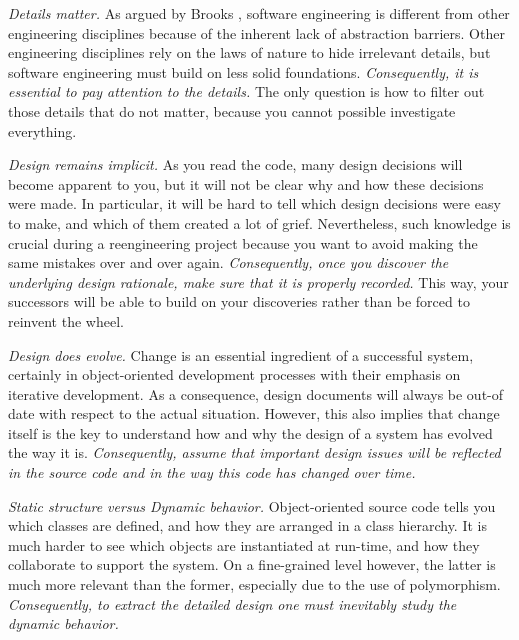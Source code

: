 \documentclass[a4paper,10pt,twoside]{book}
\begin{document}
\begin{bulletlist}
\item \emph{Details matter.}
As argued by Brooks \cite{Broo87a}, software engineering is different from other engineering disciplines because of the inherent lack of abstraction barriers. Other engineering disciplines rely on the laws of nature to hide irrelevant details, but software engineering must build on less solid foundations. \emph{Consequently, it is essential to pay attention to the details.} The only question is how to filter out those details that do not matter, because you cannot possible investigate everything.

\item \emph{Design remains implicit.}
As you read the code, many design decisions will become apparent to you, but it will not be clear why and how these decisions were made. In particular, it will be hard to tell which design decisions were easy to make, and which of them created a lot of grief. Nevertheless, such knowledge is crucial during a reengineering project because you want to avoid making the same mistakes over and over again. \emph{Consequently, once you discover the underlying design rationale, make sure that it is properly recorded.} This way, your successors will be able to build on your discoveries rather than be forced to reinvent the wheel.

\item \emph{Design does evolve.}
Change is an essential ingredient of a successful system, certainly in object-oriented development processes with their emphasis on iterative development. As a consequence, design documents will always be out-of date with respect to the actual situation. However, this also implies that change itself is the key to understand how and why the design of a system has evolved the way it is. \emph{Consequently, assume that important design issues will be reflected in the source code and in the way this code has changed over time.}

\item \emph{Static structure versus Dynamic behavior.}
Object-oriented source code tells you which classes are defined, and how they are arranged in a class hierarchy. It is much harder to see which objects are instantiated at run-time, and how they collaborate to support the system. On a fine-grained level however, the latter is much more relevant than the former, especially due to the use of polymorphism. \emph{Consequently, to extract the detailed design one must inevitably study the dynamic behavior.}
\end{bulletlist}
\end{document}
